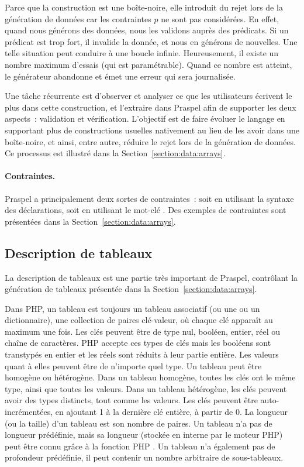Parce que la construction  est une boîte-noire, elle introduit du rejet
lors de la génération de données car les contraintes $p$ ne sont pas
considérées. En effet, quand nous générons des données, nous les validons auprès
des prédicats. Si un prédicat est trop fort, il invalide la donnée, et nous en
générons de nouvelles. Une telle situation peut conduire à une boucle infinie.
Heureusement, il existe un nombre maximum d'essais (qui est paramétrable). Quand
ce nombre est atteint, le générateur abandonne et émet une erreur qui sera
journalisée.

Une tâche récurrente est d'observer et analyser ce que les utilisateurs écrivent
le plus dans cette construction, et l'extraire dans Praspel afin de supporter
les deux aspects~: validation et vérification. L'objectif est de faire évoluer
le langage en supportant plus de constructions usuelles nativement au lieu de
les avoir dans une boîte-noire, et ainsi, entre autre, réduire le rejet lors de
la génération de données. Ce processus est illustré dans la
Section~\ref{section:data:arrays}.

\paragraph{Contraintes.} Praspel a principalement deux sortes de contraintes~:
soit en utilisant la syntaxe des déclarations, soit en utilisant le mot-clé
. Des exemples de contraintes sont présentées dans la
Section~\ref{section:data:arrays}.

\subsection{Description de tableaux}
\label{subsection:language:array}

La description de tableaux est une partie très important de Praspel, contrôlant
la génération de tableaux présentée dans la Section~\ref{section:data:arrays}.

Dans PHP, un tableau est toujours un {\strong tableau associatif} (ou une
 ou un {\strong dictionnaire}), \ie une collection de paires
clé-valeur, où chaque clé apparaît au maximum une fois. Les clés peuvent être de
type nul, booléen, entier, réel ou chaîne de caractères. PHP accepte ces types
de clés mais les booléens sont transtypés en entier et les réels sont réduits à
leur partie entière. Les valeurs quant à elles peuvent être de n'importe quel
type. Un tableau peut être {\strong homogène} ou {\strong hétérogène}. Dans un
tableau homogène, toutes les clés ont le même type, ainsi que toutes les
valeurs. Dans un tableau hétérogène, les clés peuvent avoir des types distincts,
tout comme les valeurs.  Les clés peuvent être {\strong auto-incrémentées}, en
ajoutant 1 à la dernière clé entière, à partir de 0. La {\strong longueur} (ou
la {\strong taille}) d'un tableau est son nombre de paires. Un tableau n'a pas
de longueur prédéfinie, mais sa longueur (stockée en interne par le moteur PHP)
peut être connu grâce à la fonction PHP . Un tableau n'a également
pas de profondeur prédéfinie, \ie il peut contenir un nombre arbitraire de
sous-tableaux.

